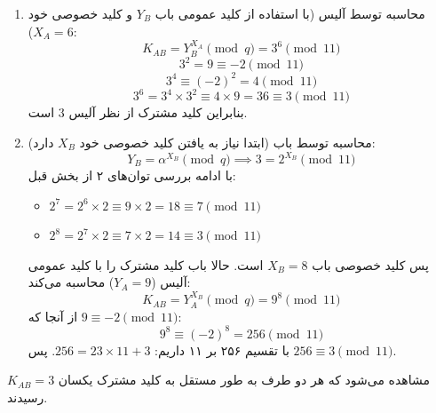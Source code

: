 \begin{enumerate}
    \item {محاسبه توسط آلیس (با استفاده از کلید عمومی باب $Y_B$ و کلید خصوصی خود $X_A = 6$):}
    $$K_{AB} = Y_B^{X_A} \pmod{q} = 3^6 \pmod{11}$$
    $$3^2 = 9 \equiv -2 \pmod{11}$$
    $$3^4 \equiv (-2)^2 = 4 \pmod{11}$$
    $$3^6 = 3^4 \times 3^2 \equiv 4 \times 9 = 36 \equiv 3 \pmod{11}$$
    بنابراین کلید مشترک از نظر آلیس $3$ است.

    \item {محاسبه توسط باب (ابتدا نیاز به یافتن کلید خصوصی خود $X_B$ دارد):}
    $$Y_B = \alpha^{X_B} \pmod{q} \implies 3 = 2^{X_B} \pmod{11}$$
    با ادامه بررسی توان‌های ۲ از بخش قبل:
    \begin{itemize}
        \item $2^7 = 2^6 \times 2 \equiv 9 \times 2 = 18 \equiv 7 \pmod{11}$
        \item $2^8 = 2^7 \times 2 \equiv 7 \times 2 = 14 \equiv 3 \pmod{11}$
    \end{itemize}
    پس کلید خصوصی باب $X_B = 8$ است. حالا باب کلید مشترک را با کلید عمومی آلیس ($Y_A = 9$) محاسبه می‌کند:
    $$K_{AB} = Y_A^{X_B} \pmod{q} = 9^8 \pmod{11}$$
    از آنجا که $9 \equiv -2 \pmod{11}$:
    $$9^8 \equiv (-2)^8 = 256 \pmod{11}$$
    با تقسیم ۲۵۶ بر ۱۱ داریم: $256 = 23 \times 11 + 3$. پس $256 \equiv 3 \pmod{11}$.
\end{enumerate}

مشاهده می‌شود که هر دو طرف به طور مستقل به کلید مشترک یکسان \textbf{$K_{AB} = 3$} رسیدند.